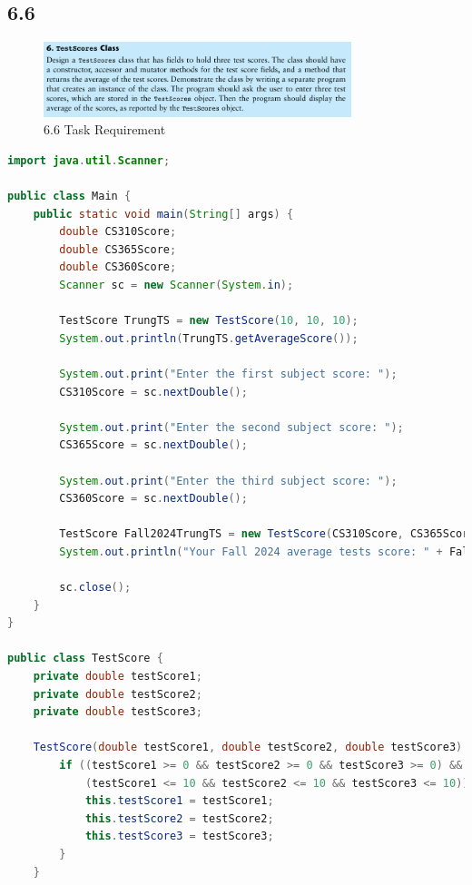 \documentclass{article}
\begin{document}
\subsection*{6.6}

\begin{figure}[H]
    \centering
    \includegraphics[width=0.8\textwidth]{./Assets/Task requirements/Assignment7/6.6.png}
    \caption{6.6 Task Requirement}
\end{figure}

\begin{lstlisting}[language=Java, caption=Main and TestScore Classes]
import java.util.Scanner;

public class Main {
    public static void main(String[] args) {
        double CS310Score;
        double CS365Score;
        double CS360Score;
        Scanner sc = new Scanner(System.in);

        TestScore TrungTS = new TestScore(10, 10, 10);
        System.out.println(TrungTS.getAverageScore());

        System.out.print("Enter the first subject score: ");
        CS310Score = sc.nextDouble();

        System.out.print("Enter the second subject score: ");
        CS365Score = sc.nextDouble();

        System.out.print("Enter the third subject score: ");
        CS360Score = sc.nextDouble();

        TestScore Fall2024TrungTS = new TestScore(CS310Score, CS365Score, CS360Score);
        System.out.println("Your Fall 2024 average tests score: " + Fall2024TrungTS.getAverageScore());

        sc.close();
    }
}

public class TestScore {
    private double testScore1;
    private double testScore2;
    private double testScore3;

    TestScore(double testScore1, double testScore2, double testScore3) {
        if ((testScore1 >= 0 && testScore2 >= 0 && testScore3 >= 0) &&
            (testScore1 <= 10 && testScore2 <= 10 && testScore3 <= 10)) {
            this.testScore1 = testScore1;
            this.testScore2 = testScore2;
            this.testScore3 = testScore3;
        }
    }


\end{lstlisting}
\end{document}
